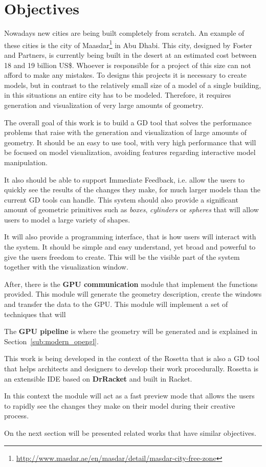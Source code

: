 
% 
% 

\section{Objectives}
\label{sec:objectives}

Nowadays new cities are being built  completely from scratch. An example of these cities is the city of Maasdar\footnote{\url{http://www.masdar.ae/en/masdar/detail/masdar-city-free-zone}} in Abu Dhabi. This city, designed by Foster and Partners, is currently being built in the desert at an estimated cost between 18 and 19 billion US\$. Whoever is responsible for a project of this size can not afford to make any mistakes.
To designs this projects it is necessary to create models, but in contrast to the relatively small size of a model of a single building, in this situations an entire city has to be modeled. Therefore, it requires generation and visualization of very large amounts of geometry.

The overall goal of this work is to build a GD tool that solves the performance problems that raise with the generation and visualization of large amounts of geometry. It should be an easy to use tool, with very high performance that will be focused on model visualization, avoiding features regarding interactive model manipulation.

It also should be able to support Immediate Feedback, i.e. allow the users to quickly see the results of the changes they make, for much larger models than the current GD tools can handle. This system should also provide a significant amount of geometric primitives such as \emph{boxes}, \emph{cylinders} or \emph{spheres} that will allow users to model a large variety of shapes.

It will also provide a programming interface, that is how users will interact with the system. It should be simple and easy understand, yet broad and powerful to give the users freedom to create. This will be the visible part of the system together with the visualization window.

After, there is the \textbf{GPU communication} module that implement the functions provided. This module will generate the geometry description, create the windows and transfer the data to the GPU. This module will implement a set of techniques that will 

The \textbf{GPU pipeline} is where the geometry will be generated and is explained in Section~\ref{sub:modern_opengl}.


This work is being developed in the context of the Rosetta that is also a GD tool that helps architects and designers to develop their work procedurally. Rosetta is an extensible IDE based on \textbf{DrRacket} and built in Racket. 

In this context the module will act as a fast preview mode that allows the users to rapidly see the changes they make on their model during their creative process.

On the next section will be presented related works that have similar objectives.
